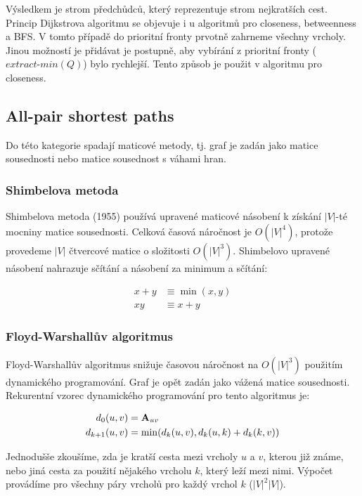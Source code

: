\documentclass[12pt,titlepage]{report}
\begin{document}
Výsledkem je strom předchůdců, který reprezentuje strom nejkratších cest.
Princip Dijkstrova algoritmu se objevuje i u algoritmů pro closeness,
betweenness a BFS. V tomto případě do prioritní fronty prvotně zahrneme všechny
vrcholy. Jinou možností je přidávat je postupně, aby vybírání z prioritní
fronty ($extract\mbox{-}min(Q)$) bylo rychlejší. Tento způsob je použit v
algoritmu pro closeness.


\subsection{All-pair shortest paths}
Do této kategorie spadají maticové metody, tj. graf je zadán jako matice
sousednosti nebo matice sousednost s váhami hran.


\subsubsection{Shimbelova metoda}
Shimbelova metoda (1955) používá upravené maticové násobení k získání $|V|$-té
mocniny matice sousednosti. Celková časová náročnost je $O(|V|^4)$, protože
provedeme $|V|$  čtvercové matice o složitosti $O(|V|^3)$.
Shimbelovo upravené násobení nahrazuje sčítání a násobení za minimum a sčítání:

\begin{align*}
x + y &\equiv \min(x, y) \\
xy &\equiv x + y
\end{align*}

\subsubsection{Floyd-Warshallův algoritmus}
Floyd-Warshallův algoritmus snižuje časovou náročnost na $O(|V|^3)$
použitím dynamického programování. Graf je opět zadán jako vážená matice
sousednosti. Rekurentní vzorec dynamického programování pro tento algoritmus je:

\begin{align*}
d_0(u, v) &= {\bf A}_{uv} \\
d_{k + 1}(u, v) &= \min(d_k(u, v), d_k(u, k) + d_k(k, v)) \\
\end{align*}

Jednodušše zkoušíme, zda je kratší cesta mezi vrcholy $u$ a $v$, kterou již
známe, nebo jiná cesta za použití nějakého vrcholu $k$, který leží mezi nimi.
Výpočet provádíme pro všechny páry vrcholů pro každý vrchol $k$ ($|V|^2 |V|$).
\end{document}
